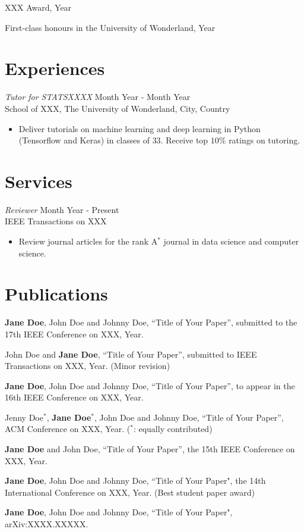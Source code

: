 \documentclass[margin, 11pt]{res} %
\begin{document}
\begin{resume}
XXX Award, Year

First-class honours in the University of Wonderland, Year

\section{Experiences}
{\sl Tutor for STATSXXXX} \hfill Month Year - Month Year \\
{School of XXX, The University of Wonderland, City, Country}
\begin{itemize}
\item Deliver tutorials on machine learning and deep learning in Python (Tensorflow and Keras) in classes of $33$. Receive top $10\%$ ratings on tutoring.
\end{itemize}

\section{Services}
{\sl Reviewer} \hfill Month Year - Present \\
{IEEE Transactions on XXX}
\begin{itemize}
\item Review journal articles for the rank A$^*$ journal in data science and computer science.
\end{itemize}

\newpage
\section{Publications}
\textbf{Jane Doe}, John Doe and Johnny Doe, ``Title of Your Paper'', submitted to the 17th IEEE Conference on XXX, Year.

John Doe and \textbf{Jane Doe}, ``Title of Your Paper'', submitted to IEEE Transactions on XXX, Year. (Minor revision)

\textbf{Jane Doe}, John Doe and Johnny Doe, ``Title of Your Paper'', to appear in the 16th IEEE Conference on XXX, Year.

Jenny Doe$^*$, \textbf{Jane Doe}$^*$, John Doe and Johnny Doe, ``Title of Your Paper'', ACM Conference on XXX, Year. ($^*$: equally contributed)

\textbf{Jane Doe} and John Doe, ``Title of Your Paper'', the 15th IEEE Conference on XXX, Year.

\textbf{Jane Doe}, John Doe and Johnny Doe, ``Title of Your Paper", the 14th International Conference on XXX, Year. (Best student paper award)

\textbf{Jane Doe}, John Doe and Johnny Doe, ``Title of Your Paper", arXiv:XXXX.XXXXX.
\end{resume}
\end{document}
